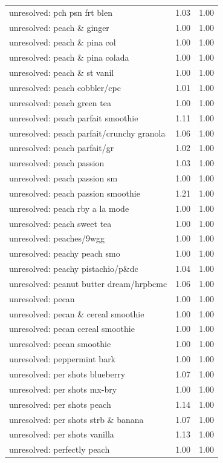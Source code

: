 \begin{table}
\begin{tabular}{lrr}
unresolved: pch psn frt blen & 1.03 & 1.00 \\
unresolved: peach \& ginger & 1.00 & 1.00 \\
unresolved: peach \& pina col & 1.00 & 1.00 \\
unresolved: peach \& pina colada & 1.00 & 1.00 \\
unresolved: peach \& st vanil & 1.00 & 1.00 \\
unresolved: peach cobbler/cpc & 1.01 & 1.00 \\
unresolved: peach green tea & 1.00 & 1.00 \\
unresolved: peach parfait smoothie & 1.11 & 1.00 \\
unresolved: peach parfait/crunchy granola & 1.06 & 1.00 \\
unresolved: peach parfait/gr & 1.02 & 1.00 \\
unresolved: peach passion & 1.03 & 1.00 \\
unresolved: peach passion sm & 1.00 & 1.00 \\
unresolved: peach passion smoothie & 1.21 & 1.00 \\
unresolved: peach rby a la mode & 1.00 & 1.00 \\
unresolved: peach sweet tea & 1.00 & 1.00 \\
unresolved: peaches/9wgg & 1.00 & 1.00 \\
unresolved: peachy peach smo & 1.00 & 1.00 \\
unresolved: peachy pistachio/p\&dc & 1.04 & 1.00 \\
unresolved: peanut butter dream/hrpbcmc & 1.06 & 1.00 \\
unresolved: pecan & 1.00 & 1.00 \\
unresolved: pecan \& cereal smoothie & 1.00 & 1.00 \\
unresolved: pecan cereal smoothie & 1.00 & 1.00 \\
unresolved: pecan smoothie & 1.00 & 1.00 \\
unresolved: peppermint bark & 1.00 & 1.00 \\
unresolved: per shots blueberry & 1.07 & 1.00 \\
unresolved: per shots mx-bry & 1.00 & 1.00 \\
unresolved: per shots peach & 1.14 & 1.00 \\
unresolved: per shots strb \& banana & 1.07 & 1.00 \\
unresolved: per shots vanilla & 1.13 & 1.00 \\
unresolved: perfectly peach & 1.00 & 1.00 \\

\end{tabular}
\end{table}
